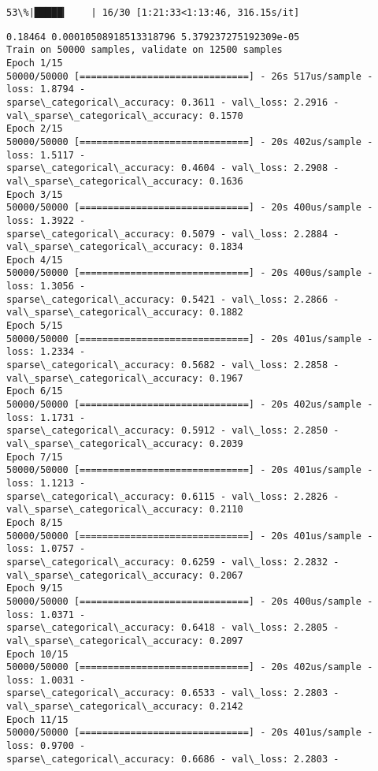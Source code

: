 \documentclass[11pt]{article}
\begin{document}
    \begin{Verbatim}[commandchars=\\\{\}]
 53\%|█████▎    | 16/30 [1:21:33<1:13:46, 316.15s/it]
    \end{Verbatim}

    \begin{Verbatim}[commandchars=\\\{\}]
0.18464 0.00010508918513318796 5.379237275192309e-05
Train on 50000 samples, validate on 12500 samples
Epoch 1/15
50000/50000 [==============================] - 26s 517us/sample - loss: 1.8794 -
sparse\_categorical\_accuracy: 0.3611 - val\_loss: 2.2916 -
val\_sparse\_categorical\_accuracy: 0.1570
Epoch 2/15
50000/50000 [==============================] - 20s 402us/sample - loss: 1.5117 -
sparse\_categorical\_accuracy: 0.4604 - val\_loss: 2.2908 -
val\_sparse\_categorical\_accuracy: 0.1636
Epoch 3/15
50000/50000 [==============================] - 20s 400us/sample - loss: 1.3922 -
sparse\_categorical\_accuracy: 0.5079 - val\_loss: 2.2884 -
val\_sparse\_categorical\_accuracy: 0.1834
Epoch 4/15
50000/50000 [==============================] - 20s 400us/sample - loss: 1.3056 -
sparse\_categorical\_accuracy: 0.5421 - val\_loss: 2.2866 -
val\_sparse\_categorical\_accuracy: 0.1882
Epoch 5/15
50000/50000 [==============================] - 20s 401us/sample - loss: 1.2334 -
sparse\_categorical\_accuracy: 0.5682 - val\_loss: 2.2858 -
val\_sparse\_categorical\_accuracy: 0.1967
Epoch 6/15
50000/50000 [==============================] - 20s 402us/sample - loss: 1.1731 -
sparse\_categorical\_accuracy: 0.5912 - val\_loss: 2.2850 -
val\_sparse\_categorical\_accuracy: 0.2039
Epoch 7/15
50000/50000 [==============================] - 20s 401us/sample - loss: 1.1213 -
sparse\_categorical\_accuracy: 0.6115 - val\_loss: 2.2826 -
val\_sparse\_categorical\_accuracy: 0.2110
Epoch 8/15
50000/50000 [==============================] - 20s 401us/sample - loss: 1.0757 -
sparse\_categorical\_accuracy: 0.6259 - val\_loss: 2.2832 -
val\_sparse\_categorical\_accuracy: 0.2067
Epoch 9/15
50000/50000 [==============================] - 20s 400us/sample - loss: 1.0371 -
sparse\_categorical\_accuracy: 0.6418 - val\_loss: 2.2805 -
val\_sparse\_categorical\_accuracy: 0.2097
Epoch 10/15
50000/50000 [==============================] - 20s 402us/sample - loss: 1.0031 -
sparse\_categorical\_accuracy: 0.6533 - val\_loss: 2.2803 -
val\_sparse\_categorical\_accuracy: 0.2142
Epoch 11/15
50000/50000 [==============================] - 20s 401us/sample - loss: 0.9700 -
sparse\_categorical\_accuracy: 0.6686 - val\_loss: 2.2803 -

\end{Verbatim}
\end{document}
